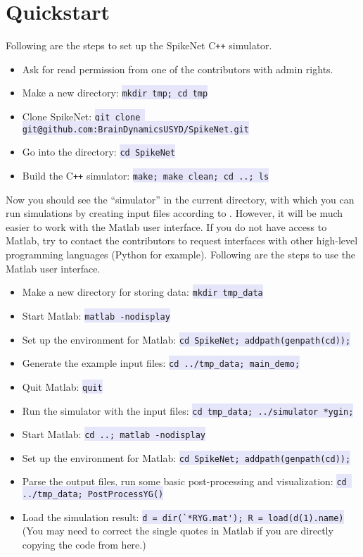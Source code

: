 \documentclass{article}
\newcommand{\mylstinline}[1] {\colorbox{Lavender}{\lstinline[basicstyle=\ttfamily\footnotesize\color{Black}]|#1|} }
\begin{document}
\section{Quickstart}
Following are the steps to set up the SpikeNet C\texttt{++} simulator.
\begin{itemize}
\item Ask for read permission from one of the contributors with admin rights.
\item Make a new directory: \mylstinline{mkdir tmp; cd tmp}
\item Clone SpikeNet: \mylstinline{git clone git@github.com:BrainDynamicsUSYD/SpikeNet.git}
\item Go into the directory: \mylstinline{cd SpikeNet}
\item Build the C\texttt{++} simulator:  \mylstinline{make; make clean; cd ..; ls}
\end{itemize}
Now you should see the ``simulator'' in the current directory, with which you can run simulations by creating input files according to .
However, it will be much easier to work with the Matlab user interface.
If you do not have access to Matlab, try to contact the contributors to request interfaces with other high-level programming languages (Python for example).
Following are the steps to use the Matlab user interface.
\begin{itemize}
\item Make a new directory for storing data: \mylstinline{mkdir tmp_data}
\item Start Matlab: \mylstinline{matlab -nodisplay}
\item Set up the environment for Matlab: \mylstinline{cd SpikeNet; addpath(genpath(cd));}
\item Generate the example input files: \mylstinline{cd ../tmp_data; main_demo;}
\item Quit Matlab: \mylstinline{quit}
\item Run the simulator with the input files: \mylstinline{cd tmp_data; ../simulator *ygin;}
\item Start Matlab: \mylstinline{cd ..; matlab -nodisplay}
\item Set up the environment for Matlab: \mylstinline{cd SpikeNet; addpath(genpath(cd));}
\item Parse the output files, run some basic post-processing and visualization: 
\newline \mylstinline{cd ../tmp_data; PostProcessYG()}
\item Load the simulation result: \mylstinline{d = dir(`*RYG.mat'); R = load(d(1).name)} (You may need to correct the single quotes in Matlab if you are directly copying the code from here.)
\end{itemize}
\end{document}
